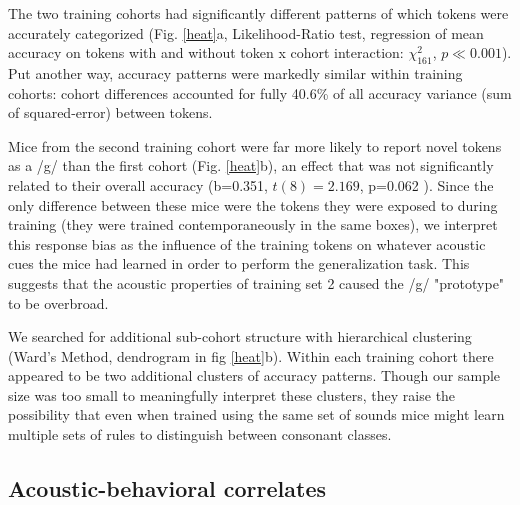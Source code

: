 \documentclass[preprint, NumberedRefs]{JASAnew}\usepackage[]{graphicx}\usepackage[]{color}
\begin{document}
The two training cohorts had significantly different patterns of which tokens were accurately categorized (Fig. \ref{heat}a, Likelihood-Ratio test, regression of mean accuracy on tokens with and without token x cohort interaction: $\chi^2_{161}$, $p \ll 0.001$). Put another way, accuracy patterns were markedly similar within training cohorts: cohort differences accounted for fully 40.6\% of all accuracy variance (sum of squared-error) between tokens.

Mice from the second training cohort were far more likely to report novel tokens as a /g/ than the first cohort (Fig. \ref{heat}b), an effect that was not significantly related to their overall accuracy (b=0.351, $t(8)=2.169$, p=0.062 ). Since the only difference between these mice were the tokens they were exposed to during training (they were trained contemporaneously in the same boxes),  we interpret this response bias as the influence of the training tokens on whatever acoustic cues the mice had learned in order to perform the generalization task. This suggests that the acoustic properties of training set 2 caused the /g/ "prototype" to be overbroad.

We searched for additional sub-cohort structure with hierarchical clustering (Ward's Method, dendrogram in fig \ref{heat}b). Within each training cohort there appeared to be two additional clusters of accuracy patterns. Though our sample size was too small to meaningfully interpret these clusters, they raise the possibility that even when trained using the same set of sounds mice might learn multiple sets of rules to distinguish between consonant classes.


%
%
%
\subsection{Acoustic-behavioral correlates}
\end{document}
